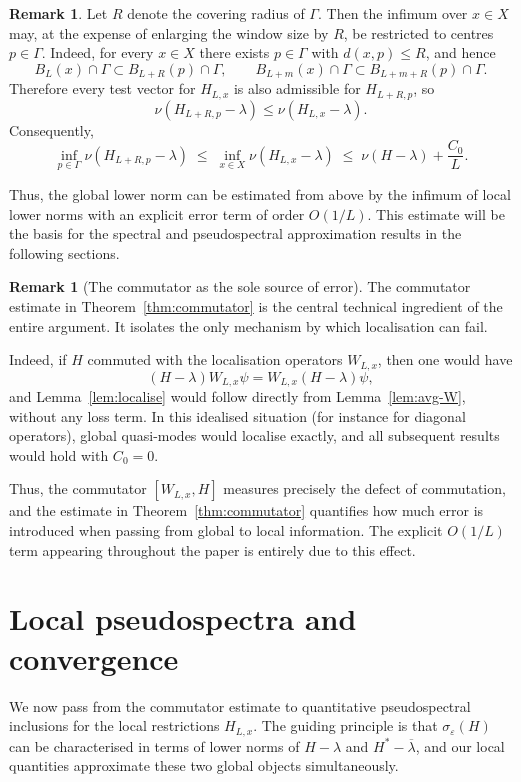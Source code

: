 \documentclass[11pt]{article}
\theoremstyle{definition}
\newtheorem{remark}[theorem]{Remark}
\begin{document}
\begin{remark}
Let $R$ denote the covering radius of $\Gamma$. Then the infimum over $x\in X$
may, at the expense of enlarging the window size by $R$, be restricted to centres
$p\in\Gamma$. Indeed, for every $x\in X$ there exists $p\in\Gamma$ with
$d(x,p)\le R$, and hence
\[
  B_L(x)\cap\Gamma \subset B_{L+R}(p)\cap\Gamma,
  \qquad
  B_{L+m}(x)\cap\Gamma \subset B_{L+m+R}(p)\cap\Gamma.
\]
Therefore every test vector for $H_{L,x}$ is also admissible for $H_{L+R,p}$, so
\[
  \nu(H_{L+R,p}-\lambda)\le \nu(H_{L,x}-\lambda).
\]
Consequently,
\[
  \inf_{p\in\Gamma}\nu(H_{L+R,p}-\lambda)
  \;\le\;
  \inf_{x\in X}\nu(H_{L,x}-\lambda)
  \;\le\;
  \nu(H-\lambda)+\frac{C_0}{L}.
\]
\end{remark}

Thus, the global lower norm can be estimated from above by the infimum of local lower norms with an explicit error term of order $O(1/L)$.
This estimate will be the basis for the spectral and pseudospectral
approximation results in the following sections.

\begin{remark}[The commutator as the sole source of error]
\label{rem:commutator-role}
The commutator estimate in Theorem~\ref{thm:commutator} is the central
technical ingredient of the entire argument. It isolates the only mechanism
by which localisation can fail.

Indeed, if $H$ commuted with the localisation operators $W_{L,x}$, then one
would have
\[
  (H-\lambda)W_{L,x}\psi = W_{L,x}(H-\lambda)\psi,
\]
and Lemma~\ref{lem:localise} would follow directly from
Lemma~\ref{lem:avg-W}, without any loss term. In this idealised situation
(for instance for diagonal operators), global quasi-modes would localise
exactly, and all subsequent results would hold with $C_0=0$.

Thus, the commutator $[W_{L,x},H]$ measures precisely the defect of
commutation, and the estimate in Theorem~\ref{thm:commutator} quantifies
how much error is introduced when passing from global to local information.
The explicit $O(1/L)$ term appearing throughout the paper is entirely due to
this effect.
\end{remark}

\section{Local pseudospectra and convergence}

\medskip
We now pass from the commutator estimate to quantitative pseudospectral
inclusions for the local restrictions $H_{L,x}$. The guiding principle is that
$\sigma_\varepsilon(H)$ can be characterised in terms of lower norms of
$H-\lambda$ and $H^*-\overline{\lambda}$, and our local quantities approximate
these two global objects simultaneously.
\end{document}

